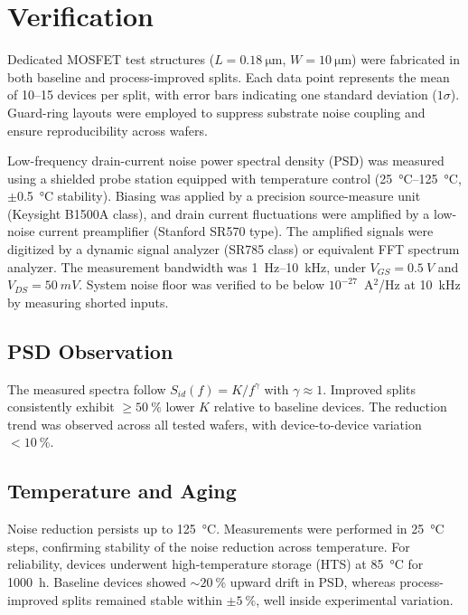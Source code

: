 \documentclass[conference]{IEEEtran}
\begin{document}
\section{Verification}
Dedicated MOSFET test structures ($L=\SI{0.18}{\um}$, $W=\SI{10}{\um}$) were fabricated in both baseline and process-improved splits. Each data point represents the mean of 10--15 devices per split, with error bars indicating one standard deviation ($1\sigma$). Guard-ring layouts were employed to suppress substrate noise coupling and ensure reproducibility across wafers.

Low-frequency drain-current noise power spectral density (PSD) was measured using a shielded probe station equipped with temperature control (\SIrange{25}{125}{\celsius}, $\pm$\SI{0.5}{\celsius} stability). Biasing was applied by a precision source-measure unit (Keysight B1500A class), and drain current fluctuations were amplified by a low-noise current preamplifier (Stanford SR570 type). The amplified signals were digitized by a dynamic signal analyzer (SR785 class) or equivalent FFT spectrum analyzer. The measurement bandwidth was \SI{1}{\hertz}–\SI{10}{\kilo\hertz}, under $V_{GS}=\SI{0.5}{V}$ and $V_{DS}=\SI{50}{mV}$. System noise floor was verified to be below $10^{-27}$~A$^{2}$/Hz at \SI{10}{\kilo\hertz} by measuring shorted inputs.

\subsection{PSD Observation}
The measured spectra follow $S_{id}(f)=K/f^{\gamma}$ with $\gamma\approx 1$. Improved splits consistently exhibit $\geq\SI{50}{\percent}$ lower $K$ relative to baseline devices. The reduction trend was observed across all tested wafers, with device-to-device variation $<\SI{10}{\percent}$.

\subsection{Temperature and Aging}
Noise reduction persists up to \SI{125}{\celsius}. Measurements were performed in \SI{25}{\celsius} steps, confirming stability of the noise reduction across temperature. For reliability, devices underwent high-temperature storage (HTS) at \SI{85}{\celsius} for 1000~h. Baseline devices showed $\sim\SI{20}{\percent}$ upward drift in PSD, whereas process-improved splits remained stable within $\pm\SI{5}{\percent}$, well inside experimental variation.
\end{document}
